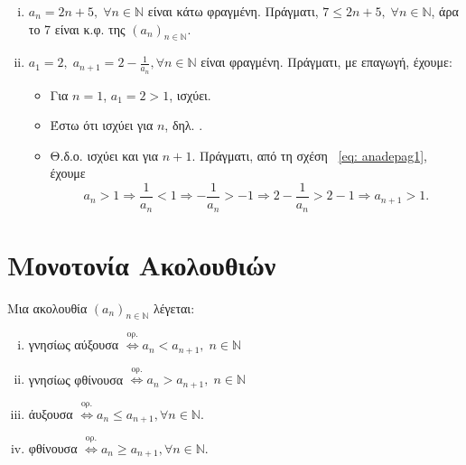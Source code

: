 \documentclass[main.tex]{subfiles}
\begin{document}
\begin{examples}
\begin{enumerate}[i)]
        \item $ a_{n}= 2n+5, \; \forall n \in \mathbb{N} $ είναι κάτω φραγμένη.
            Πράγματι, $ 7 \leq 2n+5, \; \forall n \in \mathbb{N} $, άρα το 
            7 είναι κ.φ. της $ (a_{n} )_{n \in \mathbb{N}} $.

        \item $ a_{1}=2, \; a_{n+1}=2 - \frac{1}{a_{n}}, \forall n \in \mathbb{N}$
            είναι φραγμένη. Πράγματι, με επαγωγή, έχουμε:
            \begin{itemize}
                \item Για $ n=1 $, $ a_{1}=2>1 $, ισχύει. 
                \item Έστω ότι ισχύει για $n$, δηλ. .
                \item Θ.δ.ο. ισχύει και για $ n+1 $. Πράγματι, από τη σχέση~
                    \eqref{eq: anadepag1}, έχουμε
                    \[
                        a_{n}>1 \Rightarrow \frac{1}{a_{n}} < 1 \Rightarrow - \frac{1}{a_{n}} > 
                        -1 \Rightarrow 2 - \frac{1}{a_{n}} > 2-1 \Rightarrow a_{n+1} > 1.
                    \] 
            \end{itemize}
    \end{enumerate}
\end{examples}

\section{Μονοτονία Ακολουθιών}

\begin{dfn}
    Μια ακολουθία $ (a_{n})_{n \in \mathbb{N}} $ λέγεται:
    \begin{enumerate}[i)]
        \item γνησίως αύξουσα $ \overset{\text{ορ.}}{\Leftrightarrow} a_{n} 
            < a_{n+1}, \; n \in \mathbb{N}$
        \item γνησίως φθίνουσα $ \overset{\text{ορ.}}{\Leftrightarrow} a_{n} 
            > a_{n+1}, \; n \in \mathbb{N}$
        \item άυξουσα $ \overset{\text{ορ.}}{\Leftrightarrow} a_{n} \leq 
            a_{n+1}, \forall n \in \mathbb{N}  $.
        \item φθίνουσα $ \overset{\text{ορ.}}{\Leftrightarrow} a_{n} \geq 
            a_{n+1}, \forall n \in \mathbb{N}  $.
    \end{enumerate}
\end{dfn}
\end{document}
